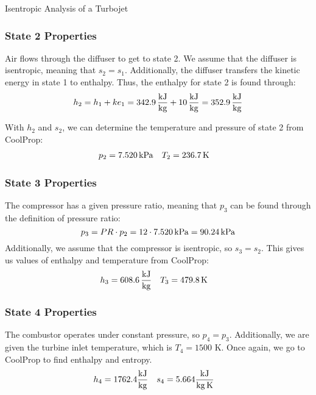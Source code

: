 \begin{example}[label=ex:turbojetIsentropic]{Isentropic Analysis of a Turbojet}
  \subsubsection*{State 2 Properties}
  Air flows through the diffuser to get to state 2.  We assume that the diffuser is isentropic, meaning that $s_2 = s_1$.  Additionally, the diffuser transfers the kinetic energy in state 1 to enthalpy.  Thus, the enthalpy for state 2 is found through:
  \begin{equation*}
    h_2 = h_1 + ke_1 = 342.9\, \frac{\rm kJ}{\rm kg} + 10\, \frac{\rm kJ}{\rm kg} = 352.9\, \frac{\rm kJ}{\rm kg}
  \end{equation*}
  
  With $h_2$ and $s_2$, we can determine the temperature and pressure of state 2 from CoolProp:
  \begin{align*}
    p_2 &= 7.520 {\rm\, kPa} & T_2 &= 236.7 {\rm\, K} 
  \end{align*}

  \subsubsection*{State 3 Properties}
  The compressor has a given pressure ratio, meaning that $p_3$ can be found through the definition of pressure ratio:
  \begin{equation*}
    p_3 = PR \cdot p_2 = 12 \cdot 7.520 {\rm\, kPa} = 90.24 {\rm\, kPa}
  \end{equation*}
  Additionally, we assume that the compressor is isentropic, so $s_3 = s_2$.  This gives us values of enthalpy and temperature from CoolProp:
  \begin{align*}
    h_3 &= 608.6\, \frac{\rm kJ}{\rm kg} &  T_3 &= 479.8 {\rm\, K}
  \end{align*}

  \subsubsection*{State 4 Properties}
  The combustor operates under constant pressure, so $p_4 = p_3$.  Additionally, we are given the turbine inlet temperature, which is $T_4 = 1500$ K.  Once again, we go to CoolProp to find enthalpy and entropy.
  \begin{align*}
    h_4 &= 1762.4 \frac{\rm kJ}{\rm kg} &  s_4 &= 5.664 \frac{\rm kJ}{\rm kg\,K}
  \end{align*}
  

\end{example}
